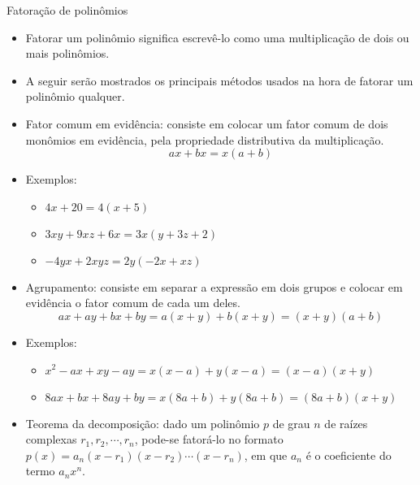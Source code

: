 \documentclass[14pt, aspectratio=169]{beamer}
\newcommand{\skipframe}{\vspace{10.0cm}}
\begin{document}
\begin{frame}[allowframebreaks]{Fatoração de polinômios}

\begin{itemize}

    \item Fatorar um polinômio significa escrevê-lo como uma multiplicação de dois ou mais polinômios.

    \item A seguir serão mostrados os principais métodos usados na hora de fatorar um polinômio qualquer.

    \skipframe

    \item Fator comum em evidência: consiste em colocar um fator comum de dois monômios em evidência, pela propriedade distributiva da multiplicação.
    \begin{equation*}
        ax + bx = x(a + b)
    \end{equation*}

    \item Exemplos:
    \begin{itemize}
        \item $4x + 20 = 4(x+5)$
        \item $3xy + 9xz + 6x = 3x(y + 3z + 2)$
        \item $-4yx + 2xyz = 2y(-2x + xz)$
    \end{itemize}

    \skipframe

    \item Agrupamento: consiste em separar a expressão em dois grupos e colocar em evidência o fator comum de cada um deles.
    \begin{equation*}
        ax + ay + bx + by = a(x+y) + b(x+y) = (x+y)(a+b)
    \end{equation*}

    \item Exemplos:
    \begin{itemize}
        \item $x^2 - ax + xy - ay = x(x-a) + y(x-a) = (x-a)(x+y)$
        \item $8ax + bx + 8ay + by = x(8a+b) + y(8a+b) = (8a + b)(x+y)$
    \end{itemize}

    \skipframe

    \item Teorema da decomposição: dado um polinômio $p$ de grau $n$ de raízes complexas $r_1, r_2, \cdots, r_n$, pode-se fatorá-lo no formato $p(x) = a_n(x - r_1)(x - r_2) \cdots (x - r_n)$, em que $a_n$ é o coeficiente do termo $a_n x^n$.

\end{itemize}
    
\end{frame}
\end{document}
